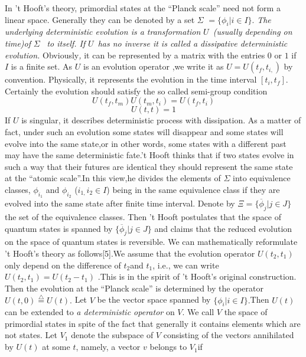 \documentclass[a4paper,12pt]{article}
\begin{document}
In 't Hooft's theory, primordial states at the ``Planck scale'' need not
form a linear space. Generally they can be denoted by a set $\Sigma $ $%
=\{\phi _i|i\in I\}$. \textit{The underlying deterministic evolution is a
transformation }$U$\textit{\ (usually depending on time)of }$\Sigma $\textit{%
\ to itself. If }$U$\textit{\ has no inverse it is called a dissipative
deterministic evolution. }Obviously\textit{, }it can be represented by a
matrix with the entries $0$ or $1$ if $I$ is a finite set. As $U$ is an
evolution operator ,we write it as $U=U(t_f,t_{i,})$ by convention.
Physically, it represents the evolution in the time interval $[t_i,t_f].$
Certainly the evolution should satisfy the so called semi-group condition
\begin{equation}
U(t_f,t_m)U(t_m,t_i)=U(t_f,t_i)
\end{equation}
\[
U(t,t)=1
\]
If $U$ is singular, it describes deterministic process with dissipation. As
a matter of fact, under such an evolution some states will disappear and
some states will evolve into the same state,or in other words, some states
with a different past may have the same deterministic fate.'t Hooft thinks
that if two states evolve in such a way that their futures are identical
they should represent the same state at the ``atomic scale''.In this view,he
divides the elements of $\Sigma $ into equivalence classes, $\phi _{i_1}$
and $\phi _{i_2}$ ($i_{1,}i_2\in I$) being in the same equivalence class if
they are evolved into the same state after finite time interval. Denote by $%
\Xi =\{\overline{\phi }_j|j\in J\}$ the set of the equivalence classes. Then
't Hooft postulates that the space of quantum states is spanned by $\{%
\overline{\phi }_j|j\in J\}$ and claims that the reduced evolution on the
space of quantum states is reversible. We can mathematically reformulate 't
Hooft's theory as follows[5].We assume that the evolution operator $%
U(t_2,t_1)$ only depend on the difference of $t_2$and $t_1$, i.e., we can
write $U(t_2,t_1)=U(t_2-t_1)$ .This is in the spirit of 't Hooft's original
construction. Then the evolution at the ``Planck scale'' is determined by
the operator $U(t,0)\stackrel{\triangle}{=} U(t).$ Let $V$ be the vector
space spanned by $\{\phi _i|i\in I\}.$Then $U(t)$ can be extended to \textit{%
a deterministic operator} on $V$. We call $V$ the space of primordial states
in spite of the fact that generally it contains elements which are not
states. Let $V_1$ denote the subspace of $V$ consisting of the vectors
annihilated by $U(t)$ at some $t$, namely, a vector $v$ belongs to $V_1$if
\end{document}
